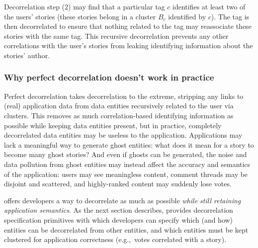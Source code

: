 Decorrelation step (2) may find that a particular tag $c$ identifies at least two of the users'
stories (these stories belong in a cluster $B_c$ identified by $c$). The tag is then decorrelated to
ensure that nothing related to the tag may reassociate these stories with the same tag.  This
recursive decorrelation prevents any other correlations with the user's stories from leaking
identifying information about the stories' author.

\subsubsection{Why perfect decorrelation doesn't work in practice}
Perfect decorrelation takes decorrelation to the extreme, stripping any links to (real) application
data from data entities recursively related to the user via clusters. This removes as much
correlation-based identifying information as possible while keeping data entities present, but in
practice, completely decorrelated data entities may be useless to the application.  Applications may
lack a meaningful way to generate ghost entities: what does it mean for a story to become many ghost
stories?  And even if ghosts can be generated, the noise and data pollution from ghost entities may
instead affect the accuracy and semantics of the application: users may see meaningless content,
comment threads may be disjoint and scattered, and highly-ranked content may suddenly lose votes. 
%

\sys{} offers developers a way to decorrelate as much as possible \emph{while still retaining
application semantics}. As the next section describes, \sys{} provides decorrelation specification
primitives with which developers can specify which (and how) entities can be decorrelated from other
entities, and which entities must be kept clustered for
application correctness (e.g.,\ votes correlated with a story).

